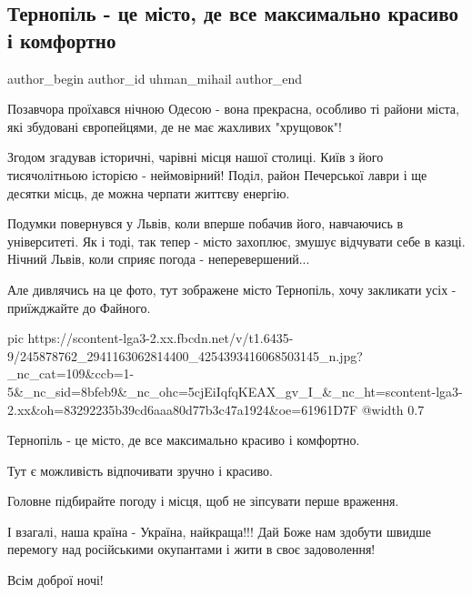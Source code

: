  
 
 
 
 
 
\subsection{Тернопіль - це місто, де все максимально красиво і комфортно}
\label{sec:16_10_2021.fb.uhman_mihail.1.ternopil_odessa_kiev}
 
\ifcmt
 author_begin
   author_id uhman_mihail
 author_end
\fi

Позавчора проїхався нічною Одесою - вона прекрасна, особливо ті райони міста,
які збудовані європейцями, де не має жахливих "хрущовок"!

Згодом згадував історичні, чарівні місця нашої столиці. Київ з його
тисячолітньою історією - неймовірний! Поділ, район Печерської лаври і ще
десятки місць, де можна черпати життєву енергію.

Подумки повернувся у Львів, коли вперше побачив його, навчаючись в
університеті. Як і тоді, так тепер - місто захоплює, змушує  відчувати себе в
казці. Нічний Львів, коли сприяє погода - неперевершений...

Але дивлячись на це фото, тут зображене місто Тернопіль, хочу закликати усіх -
приїжджайте до Файного.

\ifcmt
  pic https://scontent-lga3-2.xx.fbcdn.net/v/t1.6435-9/245878762_2941163062814400_4254393416068503145_n.jpg?_nc_cat=109&ccb=1-5&_nc_sid=8bfeb9&_nc_ohc=5cjEiIqfqKEAX_gv_I_&_nc_ht=scontent-lga3-2.xx&oh=83292235b39cd6aaa80d77b3c47a1924&oe=61961D7F
  @width 0.7
\fi

Тернопіль - це місто, де все максимально красиво і комфортно. 

Тут є можливість відпочивати зручно і красиво.

Головне підбирайте погоду і місця, щоб не зіпсувати перше враження.

І взагалі, наша країна - Україна, найкраща!!! Дай Боже нам здобути швидше
перемогу над російськими окупантами і жити в своє задоволення!

Всім доброї ночі!
